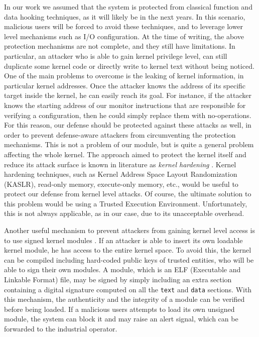In our work we assumed that the system is protected from classical function and data hooking techniques, as it will likely be in the next years.
In this scenario, malicious users will be forced to avoid these techniques, and to leverage lower level mechanisms such as I/O configuration.
At the time of writing, the above protection mechanisms are not complete, and they still have limitations.
In particular, an attacker who is able to gain kernel privilege level, can still duplicate some kernel code or directly write to kernel text without being noticed.
One of the main problems to overcome is the leaking of kernel information, in particular kernel addresses.
Once the attacker knows the address of its specific target inside the kernel, he can easily reach its goal.
For instance, if the attacker knows the starting address of our monitor instructions that are responsible for verifying a configuration,
then he could simply replace them with no-operations.
For this reason, our defense should be protected against these attacks as well, in order to prevent defense-aware attackers from circumventing the protection mechanisms.
This is not a problem of our module, but is quite a general problem affecting the whole kernel.
The approach aimed to protect the kernel itself and reduce its attack surface is known in literature as \emph{kernel hardening} \cite{hardening}.
Kernel hardening techniques, such as Kernel Address Space Layout Randomization (KASLR), read-only memory, execute-only memory, etc.,
would be useful to protect our defense from kernel level attacks. Of course, the ultimate solution to this problem would be using a Trusted Execution Environment.
Unfortunately, this is not always applicable, as in our case, due to its unacceptable overhead.

Another useful mechanism to prevent attackers from gaining kernel level access is to use signed kernel modules \cite{signed-modules}.
If an attacker is able to insert its own loadable kernel module, he has access to the entire kernel space.
To avoid this, the kernel can be compiled including hard-coded public keys of trusted entities, who will be able to sign their own modules.
A module, which is an ELF (Executable and Linkable Format) file, may be signed by simply including an extra section containing a digital signature
computed on all the \verb|text| and \verb|data| sections. With this mechanism, the authenticity and the integrity of a module can be verified before being loaded.
If a malicious users attempts to load its own unsigned module, the system can block it and may raise an alert signal,
which can be forwarded to the industrial operator.

